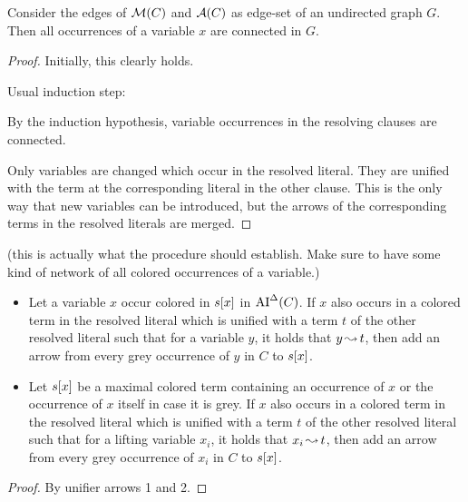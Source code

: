 \documentclass[,%
	paper=a4,%
	DIV10, %
	twoside=false,%
	liststotoc,
	bibtotoc,
	draft=false,%
	numbers=noendperiod
]{scrartcl}
\begin{document}
\begin{prop}
	\label{prop:colored_variables_connected}
	Consider the edges of $\operatorname{\mathcal{M}}(C)$ and $\operatorname{\mathcal{A}}(C)$ as edge-set of an undirected graph $G$.
	Then all occurrences of a variable $x$ are connected in $G$.
\end{prop}
\begin{proof}
	Initially, this clearly holds.

	Usual induction step:

	By the induction hypothesis, variable occurrences in the resolving clauses are connected.

	Only variables are changed which occur in the resolved literal.
	They are unified with the term at the corresponding literal in the other clause.
	This is the only way that new variables can be introduced, but the arrows of the corresponding terms in the resolved literals are merged.
\end{proof}

\begin{lemma}(this is actually what the procedure should establish. Make sure to have some kind of network of all colored occurrences of a variable.)\nopagebreak 
	\label{lemma:colored_merge_ai_de}


	\begin{itemize}
		\item
			Let a variable $x$ occur colored in $s[x]$ in $\operatorname{AI}^\Delta(C)$.
			If $x$ also occurs in a colored term in the resolved literal which is unified with a term $t$ of the other resolved literal such that for a variable $y$, it holds that $y\operatorname{\leadsto} t$, then add an arrow from every grey occurrence of $y$ in $C$ to $s[x]$.
		\item 

			Let $s[x]$ be a maximal colored term containing an occurrence of $x$ or the occurrence of $x$ itself in case it is grey.
			If $x$ also occurs in a colored term in the resolved literal which is unified with a term $t$ of the other resolved literal 
			such that for a lifting variable $x_i$, it holds that $x_i \operatorname{\leadsto} t$, then add an arrow from every grey occurrence of $x_i$ in $C$ to $s[x]$.
	\end{itemize}


\end{lemma}
\begin{proof}
	By unifier arrows 1 and 2.
\end{proof}
\end{document}
